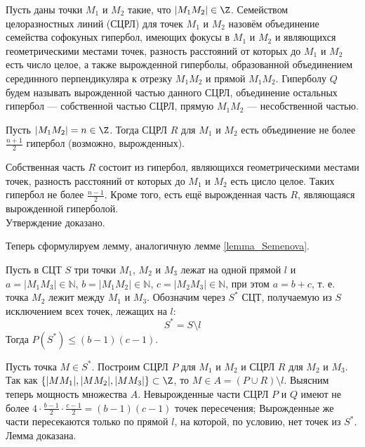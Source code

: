 \begin{opr}
	Пусть даны точки $M_1$ и $M_2$ такие, что $|M_1 M_2|\in\Z$.
	Семейством целоразностных линий (СЦРЛ) для точек $M_1$ и $M_2$ назовём объединение семейства софокуных гипербол,
	имеющих фокусы в $M_1$ и $M_2$ и являющихся геометрическими местами точек, разность расстояний от которых до $M_1$ и $M_2$ есть число целое,
	а также вырожденной гиперболы,
	образованной объединением серединного перпендикуляра к отрезку $M_1 M_2$ и прямой $M_1 M_2$.
	Гиперболу $Q$ будем называть вырожденной частью данного СЦРЛ,
	объединение остальных гипербол --- собственной частью СЦРЛ,
	прямую $M_1 M_2$ --- несобственной частью.
\end{opr}

\begin{utverzhd}
	Пусть $|M_1 M_2|= n \in\Z$.
	Тогда СЦРЛ $R$ для $M_1$ и $M_2$ есть объединение не более $\frac{n+1}{2}$ гипербол (возможно, вырожденных).
\end{utverzhd}

\dokvo
	Собственная часть $R$ состоит из гипербол, являющихся геометрическими местами точек,
	разность расстояний от которых до $M_1$ и $M_2$ есть цисло целое.
	Таких гипербол не более $\frac{n-1}{2}$.
	Кроме того, есть ещё вырожденная часть $R$, являющаяся вырожденной гиперболой.
\\ Утверждение доказано.

Теперь сформулируем лемму, аналогичную лемме \ref{lemma_Semenova}.

\begin{lemma}
	Пусть в СЦТ $S$ три точки $M_1$, $M_2$ и $M_3$ лежат на одной прямой $l$ и 
	$a=|M_1 M_3| \in \mathbb{N}$,
	$b=|M_1 M_2| \in \mathbb{N}$,
	$c=|M_2 M_3| \in \mathbb{N}$,
	при этом $a=b+c$, т. е. точка $M_2$ лежит между $M_1$ и $M_3$.
	Обозначим через $S^*$ СЦТ, получаемую из $S$ исключением всех точек, лежащих на $l$:
	$$
		S^* = S \setminus l
	$$
	Тогда
	$P(S^*) \leq (b-1)(c-1)$.
\end{lemma}

\dokvo
	Пусть точка $M \in S^*$.
	Построим СЦРЛ $P$ для $M_1$ и $M_2$ и СЦРЛ $R$ для $M_2$ и $M_3$.
	Так как $\{|M M_1|,|M M_2|,|M M_3|\}\subset\Z$, то $M\in A = (P \cup R)\setminus l$.
	Выясним теперь мощность множества $A$.
	Невырожденные части СЦРЛ $P$ и $Q$ имеют не более $4\cdot{\frac{b-1}{2}}\cdot{\frac{c-1}{2}}=(b-1)(c-1)$ точек пересечения;
	Вырожденные же части пересекаются только по прямой $l$, на которой, по условию, нет точек из $S^*$.
\\ Лемма доказана.


